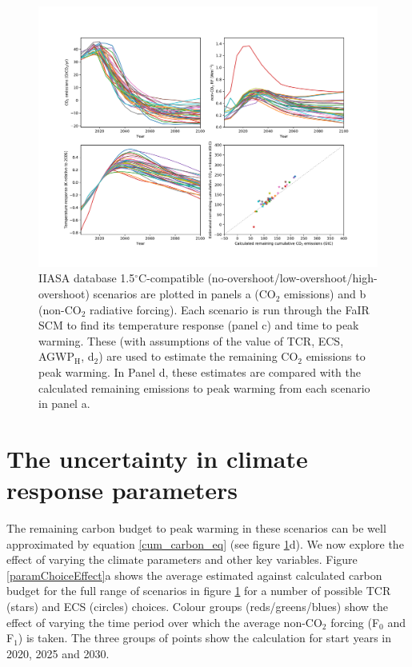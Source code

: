 \documentclass[11pt]{article}
\begin{document}
\begin{figure}[t!]
\begin{centering}
    \includegraphics[scale=0.6]{figures/all_scens_tcr175ecs260.pdf}
    \caption{IIASA database 1.5$^{\circ}$C-compatible (no-overshoot/low-overshoot/high-overshoot) scenarios are plotted in panels a (CO$_2$ emissions) and b (non-CO$_2$ radiative forcing). Each scenario is run through the FaIR SCM to find its temperature response (panel c) and time to peak warming. These (with assumptions of the value of TCR, ECS, AGWP$_\text{H}$, d$_2$) are used to estimate the remaining CO$_2$ emissions to peak warming. In Panel d, these estimates are compared with the calculated remaining emissions to peak warming from each scenario in panel a.}
    \label{proofOfConcept}
\end{centering}
\end{figure}

\newpage

\section{The uncertainty in climate response parameters}

The remaining carbon budget to peak warming in these scenarios can be well approximated by equation \ref{cum_carbon_eq} (see figure \ref{proofOfConcept}d). We now explore the effect of varying the climate parameters and other key variables. Figure \ref{paramChoiceEffect}a shows the average estimated against calculated carbon budget for the full range of scenarios in figure \ref{proofOfConcept} for a number of possible TCR (stars) and ECS (circles) choices. Colour groups (reds/greens/blues) show the effect of varying the time period over which the average non-CO$_2$ forcing (F$_0$ and F$_1$) is taken. The three groups of points show the calculation for start years in 2020, 2025 and 2030. 
\end{document}
